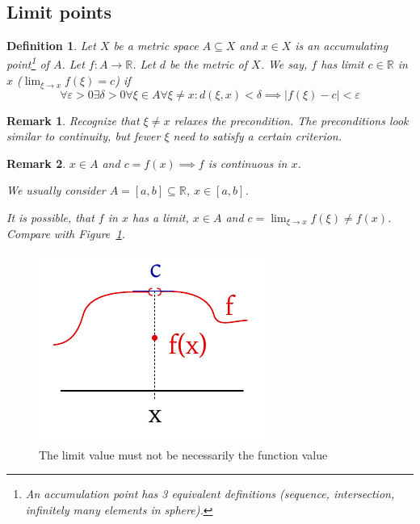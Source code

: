 \documentclass{article}
\newtheorem{definition}{Definition}  \numberwithin{definition}{section}
\newtheorem{remark}{Remark}  \numberwithin{remark}{section}
\newcommand{\card}[1]{\left|#1\right|}
\begin{document}
\subsection{Limit points}

\begin{definition} %
  Let $X$ be a metric space $A \subseteq X$ and $x \in X$ is an accumulating point\footnote{An accumulation point has 3 equivalent definitions (sequence, intersection, infinitely many elements in sphere).} of $A$. %
  Let $f: A \to \mathbb R$. Let $d$ be the metric of $X$. We say, $f$ has limit $c \in \mathbb R$ in $x$ ($\lim_{\xi\to x} f(\xi) = c$) if
  \[ \forall \varepsilon > 0 \exists \delta > 0 \forall \xi \in A \forall \xi \neq x: d(\xi, x) < \delta \implies \card{f(\xi) - c} < \varepsilon \]
\end{definition}

\begin{remark}
  Recognize that $\xi \neq x$ relaxes the precondition.
  The preconditions look similar to continuity, but fewer $\xi$ need to satisfy a certain criterion.
\end{remark}

\begin{remark}
  $x \in A$ and $c = f(x) \implies f$ is continuous in $x$.

  We usually consider $A = [a,b] \subseteq \mathbb R$, $x \in [a,b]$.

  It is possible, that $f$ in $x$ has a limit, $x \in A$ and $c = \lim_{\xi\to x} f(\xi) \neq f(x)$.
  Compare with Figure~\ref{img:limfuncvalue}.
\end{remark}

\begin{figure}[t]
  \begin{center}
    \includegraphics{img/14_special_case_limit_value_not_function_value.pdf}
    \caption{The limit value must not be necessarily the function value}
    \label{img:limfuncvalue}
  \end{center}
\end{figure}
\end{document}
